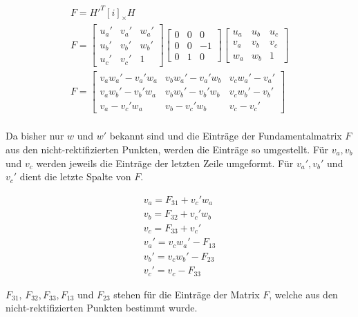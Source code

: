 \begin{gather}
	F = H'^T[i]_\times H\\
	F=
		\begin{bmatrix}
	u_a'&v_a'&w_a'\\
	u_b'&v_b'&w_b'\\
	u_c'&v_c'&1
	\end{bmatrix}
	\begin{bmatrix}
	0&0&0\\
	0&0&-1\\
	0&1&0
	\end{bmatrix} 
	\begin{bmatrix}
	u_a&u_b&u_c\\
	v_a&v_b&v_c\\
	w_a&w_b&1
	\end{bmatrix}\\
		F=
	\begin{bmatrix}
	v_aw_a' - v_a'w_a&v_bw_a' - v_a'w_b&v_cw_a' - v_a'\\
	v_aw_b' - v_b'w_a&v_bw_b' - v_b'w_b&v_cw_b' - v_b'\\
	v_a - v_c'w_a&v_b - v_c'w_b&v_c-v_c'
	\end{bmatrix}\\
\end{gather}

Da bisher nur $w$ und $w'$ bekannt sind und die Einträge der Fundamentalmatrix $F$ aus den nicht-rektifizierten Punkten, werden die Einträge so umgestellt. Für $v_a, v_b$ und $v_c$ werden jeweils die Einträge der letzten Zeile umgeformt. Für $v_a', v_b'$ und $v_c'$ dient die letzte Spalte von $F$.


\begin{gather}
	v_a = F_{31}+v_c'w_a\label{eq:va}\\
	v_b = F_{32}+v_c'w_b\\
	v_c = F_{33}+v_c'\\
	v_a' = v_cw_a'-F_{13}\\
	v_b' = v_cw_b'-F_{23}\\
	v_c' = v_c -F_{33}\label{eq:F33}
\end{gather}

$F_{31},\, F_{32}, F_{33} ,F_{13}$ und  $F_{23}$ stehen für die Einträge der Matrix $F$, welche aus den nicht-rektifizierten Punkten bestimmt wurde. \\


